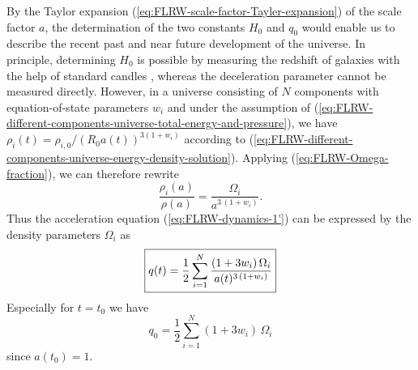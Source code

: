 \begin{bem}
	By the Taylor expansion (\ref{eq:FLRW-scale-factor-Tayler-expansion}) of the scale factor $a$, the determination of the two constants $H_0$ and $q_0$ would enable us to describe the recent past and near future development of the universe.
	In principle, determining $H_0$ is possible by measuring the redshift of galaxies with the help of standard candles \cite[104]{Ryden-2017}, whereas the deceleration parameter cannot be measured directly. However, in a universe consisting of $N$ components with equation-of-state parameters $w_i$ and under the assumption of %
	(\ref{eq:FLRW-different-components-universe-total-energy-and-pressure}), we have $\rho_i(t) = \rho_{i,0} / (R_0 a(t))^{3(1+w_i)}$ according to (\ref{eq:FLRW-different-components-universe-energy-density-solution}).
	Applying (\ref{eq:FLRW-Omega-fraction}), we can therefore rewrite 
	\begin{equation}
		\frac{\rho_i(a)}{\rho(a)}
		= \frac{\Omega_{i}}{a^{3 \, (1+w_i)}}
		.
	\end{equation}
	Thus the acceleration equation (\ref{eq:FLRW-dynamics-1'}) can be expressed by the density parameters $\Omega_i$ as \cite[104]{Ryden-2017}
	\begin{equation}
		\fbox{$ \displaystyle
		q(t)
		= \frac{1}{2} \sum_{i=1}^{N} \frac{(1 + 3w_i) \, \Omega_{i}}{a(t)^{3 \, (1+w_i)}} 
		$} %
		\label{eq:FLRW-deceleration-rate-and-density-parameters}
	\end{equation}
	Especially for $t=t_0$ we have
	\begin{equation}
		q_0
		= \frac{1}{2} \sum_{i=1}^{N} (1 + 3w_i) \, \Omega_{i}
		\label{eq:FLRW-deceleration-parameter-and-density-parameters}
	\end{equation}
	since $a(t_0)= 1$.
\end{bem}

